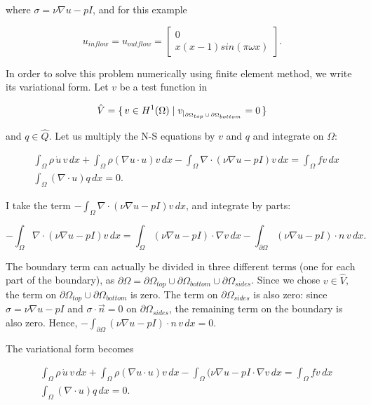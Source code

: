 \documentclass[11pt,a4paper,titlepage]{report}
\begin{document}
where $\sigma = \nu \nabla u - pI$, and for this example

\begin{equation}
u_{inflow} = u_{outflow} =  \left[ \begin{array}{c} 0 \\ x(x-1)sin(\pi \omega x) \end{array} \right].
\end{equation}

In order to solve this problem numerically using finite element method, we write its variational form. Let $v$ be a test function in

\[
\hat{V} = \set{v \in H^1(\Omega) | v_{|_{\partial \Omega_{top} \, \cup \, \partial \Omega_{bottom}}} = 0}
\]

and $q \in \hat{Q}$. Let us multiply the N-S equations by $v$ and $q$ and integrate on $\Omega$:

\begin{align}
&\int_{\Omega} \rho \, \dot{u} \, v \, dx + \int_{\Omega} \rho (\nabla u \cdot u)v \, dx - \int_{\Omega} \nabla \cdot (\nu \nabla u - pI)v \, dx = \int_{\Omega} fv \, dx \\
&\int_{\Omega} (\nabla \cdot u) q \, dx = 0.
\end{align}

I take the term $- \int_{\Omega} \nabla \cdot (\nu \nabla u - pI)v \, dx$, and integrate by parts:

\[
- \int_{\Omega} \nabla \cdot (\nu \nabla u - pI)v \, dx = \int_{\Omega} (\nu \nabla u - pI) \cdot \nabla v \, dx - \int_{\partial \Omega} (\nu \nabla u - pI) \cdot n \, v \, dx.
\]

The boundary term can actually be divided in three different terms (one for each part of the boundary), as $\partial \Omega = \partial \Omega_{top} \cup \partial \Omega_{bottom} \cup \partial \Omega_{sides}$. Since we chose $v \in \hat{V}$, the term on $\partial \Omega_{top} \cup \partial \Omega_{bottom}$ is zero. The term on $\partial \Omega_{sides}$ is also zero: since $\sigma = \nu \nabla u - pI$ and $\sigma \cdot \vec{n} = 0$ on $\partial \Omega_{sides}$, the remaining term on the boundary is also zero. Hence, $- \int_{\partial \Omega} (\nu \nabla u - pI) \cdot n \, v \, dx = 0$.

The variational form becomes

\begin{align}
&\int_{\Omega} \rho \, \dot{u} \, v \, dx + \int_{\Omega} \rho (\nabla u \cdot u)v \, dx - \int_{\Omega} (\nu \nabla u - pI \cdot \nabla v \, dx = \int_{\Omega} fv \, dx \\
&\int_{\Omega} (\nabla \cdot u) q \, dx = 0.
\end{align}
\end{document}
